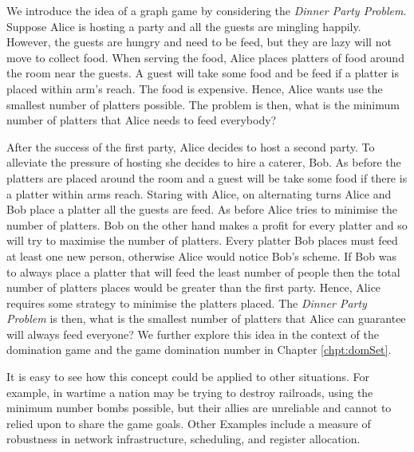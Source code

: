 We introduce the idea of a graph game by considering the \textit{Dinner Party Problem}.
Suppose Alice is hosting a party and all the guests are mingling happily. However, the guests are hungry and need to be feed, but they are lazy will not move to collect food. When serving the food, Alice places platters of food around the room near the guests. A guest will take some food and be feed if a platter is placed within arm's reach. The food is expensive. Hence, Alice wants use the smallest number of platters possible. The problem is then, what is the minimum number of platters that Alice needs to feed everybody? 


After the success of the first party, Alice decides to host a second party. To alleviate the pressure of hosting she decides to hire a caterer, Bob. As before the platters are placed around the room and a guest will be take some food if there is a platter within arms reach. Staring with Alice, on alternating turns Alice and Bob place a platter all the guests are feed. As before Alice tries to minimise the number of platters. Bob on the other hand makes a profit for every platter and so will try to maximise the number of platters. Every platter Bob places must feed at least one new person, otherwise Alice would notice Bob's scheme.
If Bob was to always place a platter that will feed the least number of people then the total number of platters places would be greater than the first party. Hence, Alice requires some strategy to minimise the platters placed. The \textit{Dinner Party Problem} is then, what is the smallest number of platters that Alice can guarantee will always feed everyone? 
We further explore this idea in the context of the domination game and the game domination number in Chapter \ref{chpt:domSet}.

It is easy to see how this concept could be applied to other situations. For example, in wartime a nation may be trying to destroy railroads, using the minimum number bombs possible, but their allies are unreliable and cannot to relied upon to share the game goals. Other Examples include a measure of robustness in network infrastructure, scheduling, and register allocation.  

